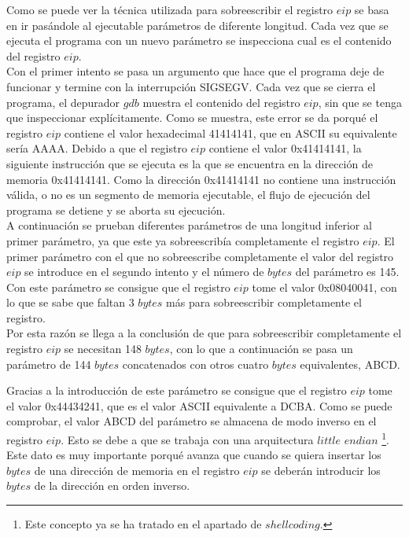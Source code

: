\documentclass [titlepage, 12pt]{article}
\begin{document}
Como se puede ver la t\'ecnica utilizada para sobreescribir el registro $eip$ se basa en ir pas\'andole al ejecutable par\'ametros de diferente longitud. Cada vez que se ejecuta el programa con un nuevo par\'ametro se inspecciona cual es el contenido del registro $eip$.\\
Con el primer intento se pasa un argumento que hace que el programa deje de funcionar y termine con la interrupci\'on SIGSEGV. Cada vez que se cierra el programa, el depurador $gdb$ muestra el contenido del registro $eip$, sin que se tenga que inspeccionar expl\'icitamente. Como se muestra, este error se da porqu\'e el registro $eip$ contiene el valor hexadecimal 41414141, que en ASCII su equivalente ser\'ia AAAA. Debido a que el registro $eip$ contiene el valor 0x41414141, la siguiente instrucci\'on que se ejecuta es la que se encuentra en la direcci\'on de memoria 0x41414141. Como la direcci\'on 0x41414141 no contiene una instrucci\'on v\'alida, o no es un segmento de memoria ejecutable, el flujo de ejecuci\'on del programa se detiene y se aborta su ejecuci\'on.\\
A continuaci\'on se prueban diferentes par\'ametros de una longitud inferior al primer par\'ametro, ya que este ya sobreescrib\'ia completamente el registro $eip$. El primer par\'ametro con el que no sobreescribe completamente el valor del registro $eip$ se introduce en el segundo intento y el n\'umero de $bytes$ del par\'ametro es 145. Con este par\'ametro se consigue que el registro $eip$ tome el valor 0x08040041, con lo que se sabe que faltan 3 $bytes$ m\'as para sobreescribir completamente el registro. \\
Por esta raz\'on se llega a la conclusi\'on de que para sobreescribir completamente el registro $eip$ se necesitan 148 $bytes$, con lo que a continuaci\'on se pasa un par\'ametro de 144 $bytes$ concatenados con otros cuatro $bytes$ equivalentes, ABCD.\bigskip

Gracias a la introducci\'on de este par\'ametro se consigue que el registro $eip$ tome el valor 0x44434241, que es el valor ASCII equivalente a DCBA. Como se puede comprobar, el valor ABCD del par\'ametro se almacena de modo inverso en el registro $eip$. Esto se debe a que se trabaja con una arquitectura $little$ $endian$ \footnote{Este concepto ya se ha tratado en el apartado de $shellcoding$.}. Este dato es muy importante porqu\'e avanza que cuando se quiera insertar los $bytes$ de una direcci\'on de memoria en el registro $eip$ se deber\'an introducir los $bytes$ de la direcci\'on en orden inverso. \bigskip
\end{document}
